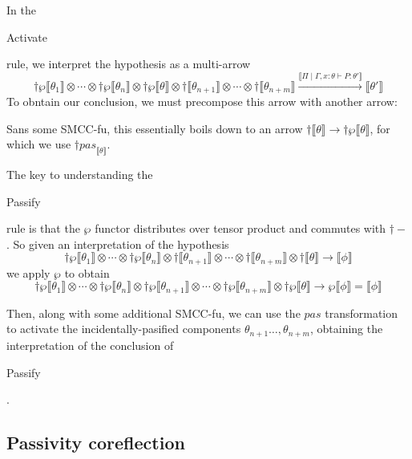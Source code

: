 \documentclass{article}
\newcommand{\sem}[1]{\llbracket #1 \rrbracket}
\begin{document}
In the \begin{sc} Activate \end{sc} rule, we interpret the hypothesis as a multi-arrow
$$\dagger \wp \sem{\theta_1} \otimes \cdots \otimes \dagger \wp \sem{\theta_n} \otimes \dagger \wp \sem{\theta} \otimes \dagger \sem{\theta_{n+1}} \otimes \cdots \otimes \dagger \sem{\theta_{n+m}} \overset{\sem{\Pi \mid \Gamma, x:\theta \vdash P : \theta'}}{\longrightarrow} \sem{\theta'}$$
To obntain our conclusion, we must precompose this arrow with another arrow:
\begin{center}
\end{center}
Sans some SMCC-fu, this essentially boils down to an arrow $\dagger \sem{\theta} \to \dagger \wp \sem{\theta}$,
for which we use $\dagger \mathit{pas}_{\sem{\theta}}$.

The key to understanding the \begin{sc} Passify \end{sc} rule is that the $\wp$ functor distributes over
tensor product and commutes with $\dagger -$. So given an interpretation of the hypothesis $$\dagger \wp \sem{\theta_1} \otimes \cdots \otimes \dagger \wp \sem{\theta_n} \otimes \dagger \sem{\theta_{n+1}} \otimes \cdots \otimes \dagger \sem{\theta_{n+m}} \otimes \dagger \sem{\theta} \to \sem{\phi}$$
we apply $\wp$ to obtain
$$\dagger \wp \sem{\theta_1} \otimes \cdots \otimes \dagger \wp \sem{\theta_n} \otimes \dagger \wp \sem{\theta_{n+1}} \otimes \cdots \otimes \dagger \wp \sem{\theta_{n+m}} \otimes \dagger \wp \sem{\theta} \to \wp \sem{\phi} = \sem{\phi}$$

Then, along with some additional SMCC-fu, we can use the $\mathit{pas}$ transformation to activate the incidentally-pasified components $\theta_{n+1} \ldots, \theta_{n+m}$, obtaining the interpretation of the conclusion of 
\begin{sc} Passify \end{sc}. 

\subsection*{Passivity coreflection}
\end{document}
